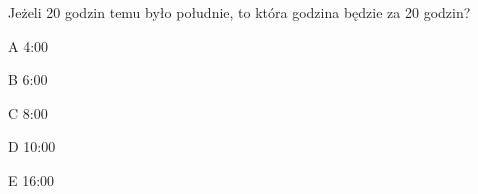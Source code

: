 \begin{tresc}
Jeżeli 20 godzin temu było południe, to która godzina będzie za 20 godzin?
\end{tresc}
\begin{wariant}{A} 4:00 \end{wariant}
\begin{wariant}{B} 6:00 \end{wariant}
\begin{wariant}{C} 8:00 \end{wariant}
\begin{wariant}{D} 10:00 \end{wariant}
\begin{wariant}{E} 16:00 \end{wariant}
